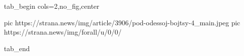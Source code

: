  
 
 
 
 

\ifcmt
  tab_begin cols=2,no_fig,center

     pic https://strana.news/img/article/3906/pod-odessoj-bojtsy-4_main.jpeg
		 pic https://strana.news/img/forall/u/0/0/%

  tab_end
\fi
